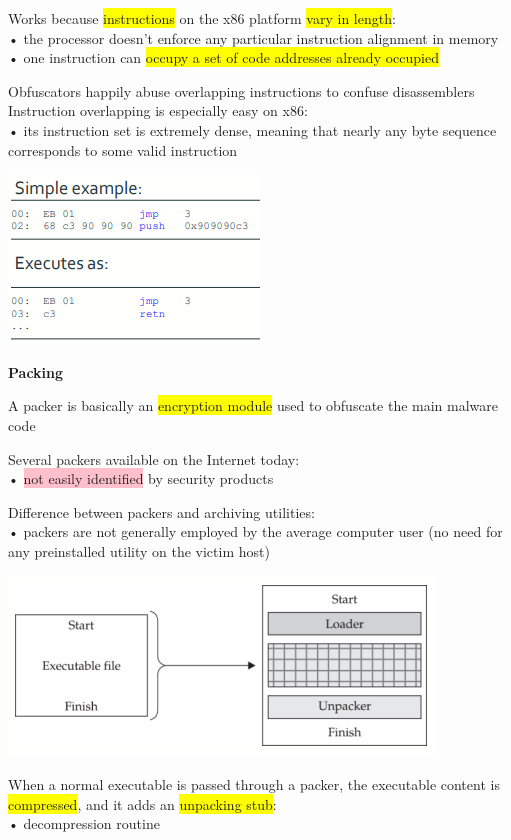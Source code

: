 \documentclass[]{project_plan}
\begin{document}
Works because \colorbox{yellow}{instructions} on the x86 platform \colorbox{yellow}{vary in length}:\\
• the processor doesn’t enforce any particular instruction alignment in memory\\
• one instruction can \colorbox{yellow}{occupy a set of code addresses already occupied}

Obfuscators happily abuse overlapping instructions to confuse disassemblers\\
Instruction overlapping is especially easy on x86:\\
• its instruction set is extremely dense, meaning that nearly any byte sequence corresponds to some
valid instruction

\includegraphics[width=.5\linewidth]{overlapping insturctions eg.png}

\textbf{Packing}

A packer is basically an \colorbox{yellow}{encryption module} used to obfuscate the main malware code

Several packers available on the Internet today:\\
• \colorbox{pink}{not easily identified} by security products

Difference between packers and archiving utilities:\\
• packers are not generally employed by the average computer user (no need for any preinstalled utility on the
victim host)

\includegraphics[width=.6\linewidth]{packing.png}

When a normal executable is passed through a packer, the executable content is
\colorbox{yellow}{compressed}, and it adds an \colorbox{yellow}{unpacking stub}:\\
• decompression routine
\end{document}
